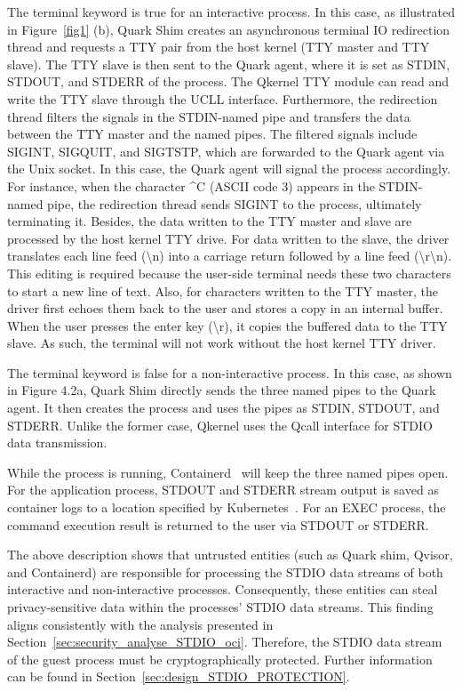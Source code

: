 The terminal keyword is true for an interactive process. In this case, as illustrated in Figure~\ref{fig1} (b), Quark Shim creates an asynchronous terminal IO redirection thread and requests a TTY pair from the host kernel (TTY master and TTY slave). The TTY slave is then sent to the Quark agent, where it is set as STDIN, STDOUT, and STDERR of the process. 
The Qkernel TTY module can read and write the TTY slave through the UCLL interface. Furthermore, the redirection thread filters the signals in the STDIN-named pipe and transfers the data between the TTY master and the named pipes. The filtered signals include SIGINT, SIGQUIT, and SIGTSTP, which are forwarded to the Quark agent via the Unix socket. In this case, 
the Quark agent will signal the process accordingly. For instance, when the character \textasciicircum C (ASCII code 3) appears in the STDIN-named pipe, the redirection thread sends SIGINT to the process, ultimately terminating it. Besides, the data written to the TTY master and slave are processed by the host kernel TTY drive. For data written to the slave, the driver translates 
each line feed (\textbackslash n) into a carriage return followed by a line feed (\textbackslash r\textbackslash n). This editing is required because the user-side terminal needs these two characters to start a new line of text. Also, for characters written to the TTY master, the driver first echoes them back to the user and stores a copy in an internal buffer. 
When the user presses the enter key (\textbackslash r), it copies the buffered data to the TTY slave. As such, the terminal will not work without the host kernel TTY driver.

 

The terminal keyword is false for a non-interactive process. In this case, as shown in Figure 4.2a, Quark Shim directly sends the three named pipes to the Quark agent. It then creates the process and uses the pipes as STDIN, STDOUT, and STDERR. Unlike the former case, Qkernel uses the Qcall interface for STDIO data transmission.

While the process is running, Containerd~\cite*{containerd} will keep the three named pipes open. For the application process, STDOUT and STDERR stream output is saved as container logs to a location specified by Kubernetes~\cite*{k8s}. For an EXEC process, the command execution result is returned to the user via STDOUT or STDERR.


The above description shows that untrusted entities (such as Quark shim, Qvisor, and Containerd) are responsible for processing the STDIO data streams of both interactive and non-interactive processes. Consequently, these entities can steal privacy-sensitive data within the processes' STDIO data streams. This finding aligns consistently with the 
analysis presented in Section~\ref{sec:security_analyse_STDIO_oci}. Therefore, the STDIO data stream of the guest process must be cryptographically protected. Further information can be found in Section~\ref{sec:design_STDIO_PROTECTION}.



